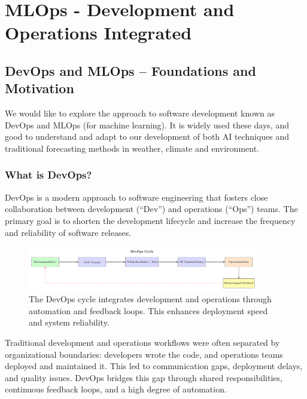 \chapter{MLOps - Development and Operations Integrated}


%
\section{DevOps and MLOps – Foundations and Motivation}

We would like to explore the approach to software development known as DevOps and MLOps (for machine learning). It is widely used these days, and good to understand and adapt to our development of both AI techniques and traditional forecasting methods in weather, climate and environment. 

%
\subsection{What is DevOps?}

DevOps is a modern approach to software engineering that fosters close collaboration between development (``Dev'') and operations (``Ops'') teams. The primary goal is to shorten the development lifecycle and increase the frequency and reliability of software releases.

\begin{figure}[ht]
\centering
\includegraphics[width=0.9\textwidth]{images/devops1.pdf}
\caption{The DevOps cycle integrates development and operations through automation and feedback loops. This enhances deployment speed and system reliability.}
\end{figure}


Traditional development and operations workflows were often separated by organizational boundaries: developers wrote the code, and operations teams deployed and maintained it. This led to communication gaps, deployment delays, and quality issues. DevOps bridges this gap through shared responsibilities, continuous feedback loops, and a high degree of automation.


